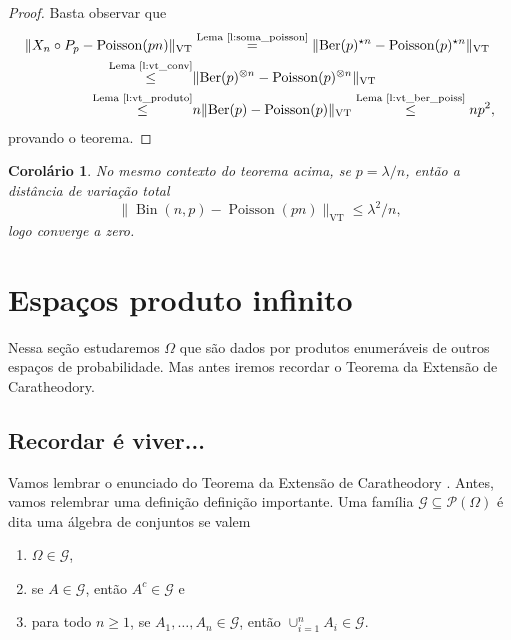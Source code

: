 \documentclass[reqno, final]{book}
\newcommand*\1{\mathds{1}}
\newtheorem{corollary}[theorem]{Corolário}
\DeclareMathOperator{\Poisson}{Poisson}
\DeclareMathOperator{\Ber}{Ber}
\DeclareMathOperator{\Bin}{Bin}
\DeclareMathOperator{\VT}{VT}
\begin{document}
\begin{proof}
  Basta observar que
  \begin{equation}
    \begin{split}
      \lVert X_n \circ P_p - \Poisson(pn) \rVert_{\VT} & \overset{\text{Lema~\ref{l:soma_poisson}}}= \lVert \Ber(p)^{\star n} - \Poisson(p)^{\star n} \rVert_{\VT}\\
      \overset{\text{Lema~\ref{l:vt_conv}}}\leq & \lVert \Ber(p)^{\otimes n} - \Poisson(p)^{\otimes n} \rVert_{\VT}\\
      \overset{\text{Lema~\ref{l:vt_produto}}}\leq & n \lVert \Ber(p) - \Poisson(p) \rVert_{\VT} \overset{\text{Lema~\ref{l:vt_ber_poiss}}}\leq n p^2,
    \end{split}
  \end{equation}
  provando o teorema.
\end{proof}

\begin{corollary}
  No mesmo contexto do teorema acima, se $p = \lambda/n$, então a distância de variação total
  \begin{equation}
    \lVert \Bin(n,p) - \Poisson(pn) \rVert_{\VT} \leq \lambda^2 / n,
  \end{equation}
  logo converge a zero.
\end{corollary}

\vfill
\newpage

\section{Espaços produto infinito}
\label{s:Omega_produto}

Nessa seção estudaremos $\Omega$ que são dados por produtos enumeráveis de outros espaços de probabilidade.
Mas antes iremos recordar o Teorema da Extensão de Caratheodory.

\subsection{Recordar é viver...}

Vamos lembrar o enunciado do Teorema da Extensão de Caratheodory .
Antes, vamos relembrar uma definição definição importante.
Uma família $\mathcal{G} \subseteq \mathcal{P}(\Omega)$ é dita uma álgebra de conjuntos  se valem
\begin{enumerate}[\quad a)]
  \item $\Omega \in \mathcal{G}$,
  \item se $A \in \mathcal{G}$, então $A^c \in \mathcal{G}$ e
  \item para todo $n \geq 1$, se $A_1, \dots, A_n \in \mathcal{G}$, então $\cup_{i=1}^n A_i \in \mathcal{G}$.
\end{enumerate}
\end{document}

